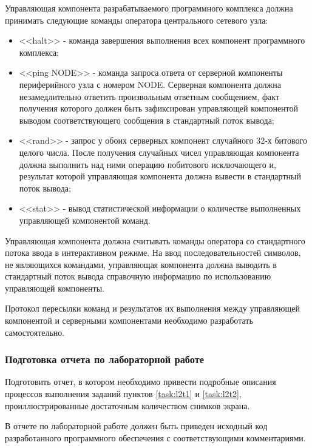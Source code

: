 	Управляющая компонента разрабатываемого программного комплекса должна принимать следующие команды оператора
	центрального сетевого узла:

	\begin{itemize}

		\item <<halt>> - команда завершения выполнения всех компонент программного комплекса;

		\item <<ping NODE>> - команда запроса ответа от серверной компоненты периферийного узла с номером NODE.
		Серверная компонента должна незамедлительно ответить произвольным ответным сообщением, факт получения которого
		должен быть зафиксирован управляющей компонентой выводом соответствующего сообщения в стандартный поток вывода;

		\item <<rand>> - запрос у обоих серверных компонент случайного 32-х битового целого числа. После получения
		случайных чисел управляющая компонента должна выполнить над ними операцию побитового исключающего и,
		результат которой управляющая компонента должна вывести в стандартный поток вывода;

		\item <<stat>> - вывод статистической информации о количестве выполненных управляющей компонентой команд.

	\end{itemize}

	Управляющая компонента должна считывать команды оператора со стандартного потока ввода в интерактивном режиме.
	На ввод последовательностей символов, не являющихся командами, управляющая компонента должна выводить в стандартный
	поток вывода справочную информацию по использованию управляющей компоненты.

	Протокол пересылки команд и результатов их выполнения между управляющей компонентой и серверными компонентами
	необходимо разработать самостоятельно.

\subsubsection{Подготовка отчета по лабораторной работе}

	Подготовить отчет, в котором необходимо привести подробные описания процессов выполнения заданий пунктов
	\ref{task:l2t1} и \ref{task:l2t2}, проиллюстрированные достаточным количеством снимков экрана.

	В отчете по лабораторной работе должен быть приведен исходный код разработанного программного обеспечения с
	соответствующими комментариями.

